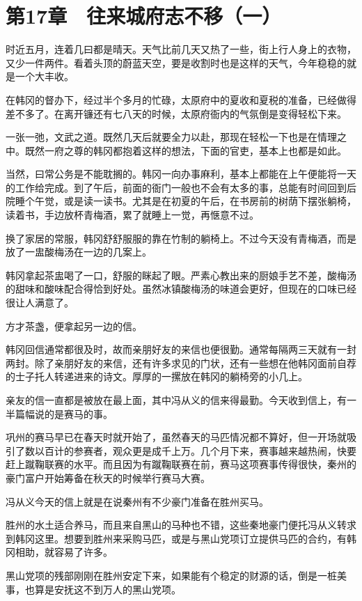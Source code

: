 \section{第17章　往来城府志不移（一）}

时近五月，连着几曰都是晴天。天气比前几天又热了一些，街上行人身上的衣物，又少一件两件。看着头顶的蔚蓝天空，要是收割时也是这样的天气，今年稳稳的就是一个大丰收。

在韩冈的督办下，经过半个多月的忙碌，太原府中的夏收和夏税的准备，已经做得差不多了。在离开镰还有七八天的时候，太原府衙内的气氛倒是变得轻松下来。

一张一弛，文武之道。既然几天后就要全力以赴，那现在轻松一下也是在情理之中。既然一府之尊的韩冈都抱着这样的想法，下面的官吏，基本上也都是如此。

当然，曰常公务是不能耽搁的。韩冈一向办事麻利，基本上都能在上午便能将一天的工作给完成。到了午后，前面的衙门一般也不会有太多的事，总能有时间回到后院睡个午觉，或是读一读书。尤其是在初夏的午后，在书房前的树荫下摆张躺椅，读着书，手边放杯青梅酒，累了就睡上一觉，再惬意不过。

换了家居的常服，韩冈舒舒服服的靠在竹制的躺椅上。不过今天没有青梅酒，而是放了一盅酸梅汤在一边的几案上。

韩冈拿起茶盅喝了一口，舒服的眯起了眼。严素心教出来的厨娘手艺不差，酸梅汤的甜味和酸味配合得恰到好处。虽然冰镇酸梅汤的味道会更好，但现在的口味已经很让人满意了。

方才茶盏，便拿起另一边的信。

韩冈回信通常都很及时，故而亲朋好友的来信也便很勤。通常每隔两三天就有一封两封。除了亲朋好友的来信，还有许多求见的门状，还有一些想在他韩冈面前自荐的士子托人转递进来的诗文。厚厚的一摞放在韩冈的躺椅旁的小几上。

亲友的信一直都是被放在最上面，其中冯从义的信来得最勤。今天收到信上，有一半篇幅说的是赛马的事。

巩州的赛马早已在春天时就开始了，虽然春天的马匹情况都不算好，但一开场就吸引了数以百计的参赛者，观众更是成千上万。几个月下来，赛事越来越热闹，快要赶上蹴鞠联赛的水平。而且因为有蹴鞠联赛在前，赛马这项赛事传得很快，秦州的豪门富户开始筹备在秋天的时候举行赛马大赛。

冯从义今天的信上就是在说秦州有不少豪门准备在胜州买马。

胜州的水土适合养马，而且来自黑山的马种也不错，这些秦地豪门便托冯从义转求到韩冈这里。想要到胜州来采购马匹，或是与黑山党项订立提供马匹的合约，有韩冈相助，就容易了许多。

黑山党项的残部刚刚在胜州安定下来，如果能有个稳定的财源的话，倒是一桩美事，也算是安抚这不到万人的黑山党项。

